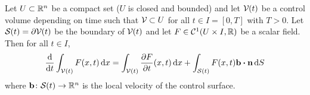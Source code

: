 \begin{theorem}
	Let $U \subset \mathbb{R}^n$ be a compact set (\ie $U$ is closed and bounded) and
	let $\mathcal{V}_{}(t)$ be a control volume depending on time such that $\mathcal{V}_{}
	\subset U$ for all $t \in I = [0, T]$ with $T > 0$. Let $\mathcal{S}_{}(t) = \partial
	\mathcal{V}_{}(t)$ be the boundary of $\mathcal{V}_{}(t)$ and let $F \in \mathcal{C}^1(U
	\times I, \mathbb{R})$ be a scalar field. Then for all $t \in I$,
	\begin{equation*}
		\frac{\dd}{\dd{t}} \int_\cvt F(x, t) \dd{x} = 
		\int_\cvt \frac{\partial F}{\partial t} (x, t) \dd{x} + 
		\int_\cst F(x, t) \vb{b} \vdot \vb{n} \dd{S}
	\end{equation*}
	where $\vb{b} \colon \mathcal{S}_{}(t) \rightarrow \mathbb{R}^n$ is the local velocity of
	the control surface.
\end{theorem}
